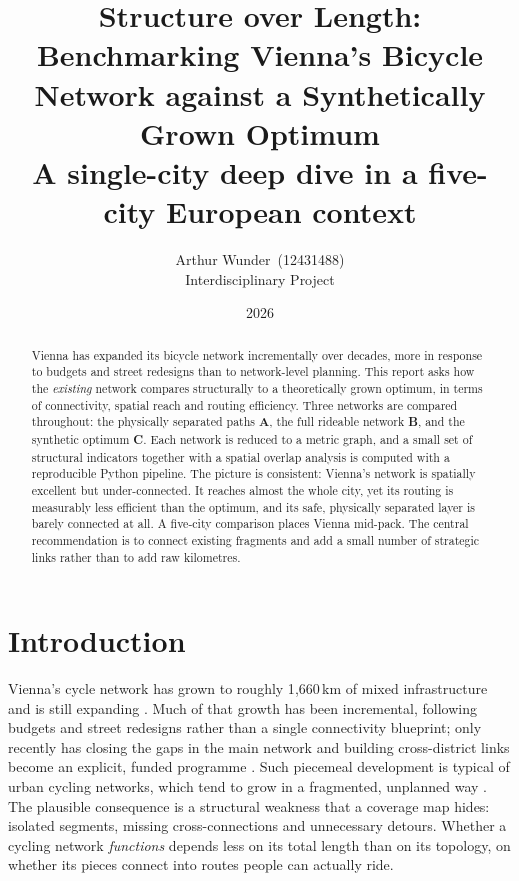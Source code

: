 \documentclass[11pt,a4paper]{article}
\title{\vspace{-1.2cm}\textbf{Structure over Length:\\
Benchmarking Vienna's Bicycle Network against a Synthetically Grown Optimum}\\[0.3em]
\large A single-city deep dive in a five-city European context}
\author{Arthur Wunder \,(12431488)\\ \small Interdisciplinary Project}
\date{2026}
\begin{document}
\maketitle
\vspace{-0.8em}

\begin{abstract}
\noindent
Vienna has expanded its bicycle network incrementally over decades, more in response to
budgets and street redesigns than to network-level planning. This report asks how the
\emph{existing} network compares structurally to a theoretically grown optimum, in terms
of connectivity, spatial reach and routing efficiency. Three networks are compared
throughout: the physically separated paths \textbf{A}, the full rideable network
\textbf{B}, and the synthetic optimum \textbf{C}. Each network is reduced to a metric
graph, and a small set of structural indicators together with a spatial overlap analysis
is computed with a reproducible Python pipeline. The picture is consistent: Vienna's
network is spatially excellent but under-connected. It reaches almost the whole city, yet
its routing is measurably less efficient than the optimum, and its safe, physically
separated layer is barely connected at all. A five-city comparison places Vienna mid-pack.
The central recommendation is to connect existing fragments and add a small number of
strategic links rather than to add raw kilometres.
\end{abstract}

\section{Introduction}

Vienna's cycle network has grown to roughly 1{,}660\,km of mixed infrastructure and is
still expanding \citep{wiencyclenet}. Much of that growth has been incremental, following
budgets and street redesigns rather than a single connectivity blueprint; only recently
has closing the gaps in the main network and building cross-district links become an
explicit, funded programme \citep{wienradprogramm}. Such piecemeal development is typical
of urban cycling networks, which tend to grow in a fragmented, unplanned way
\citep{szell2022}. The plausible consequence is a structural weakness that a coverage map
hides: isolated segments, missing cross-connections and unnecessary detours. Whether a
cycling network \emph{functions} depends less on its total length than on its topology, on
whether its pieces connect into routes people can actually ride.
\end{document}
